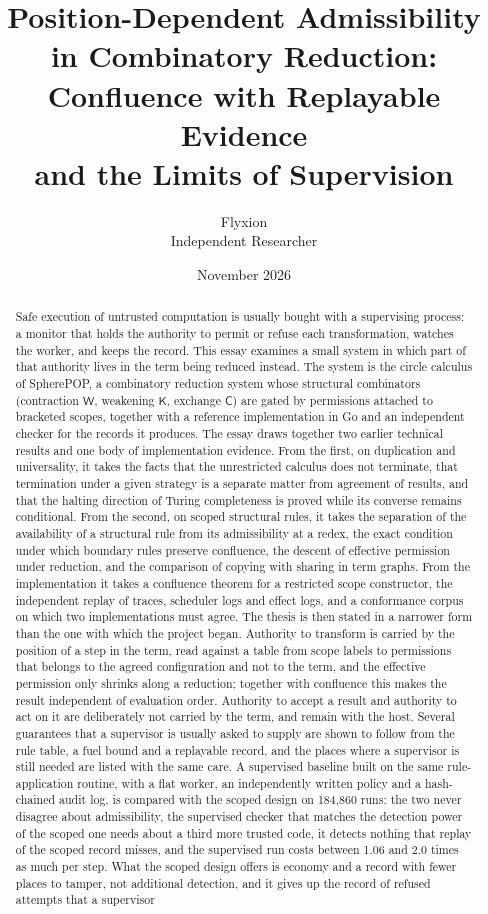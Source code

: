 \documentclass[11pt]{article}
\title{Position-Dependent Admissibility in Combinatory Reduction:\\Confluence with Replayable Evidence\\and the Limits of Supervision}
\author{Flyxion\\Independent Researcher}
\date{November 2026}
\theoremstyle{definition}
\theoremstyle{remark}
\newcommand{\cC}{\mathsf{C}}
\newcommand{\cK}{\mathsf{K}}
\newcommand{\cW}{\mathsf{W}}
\begin{document}
\maketitle

\begin{abstract}
\noindent
Safe execution of untrusted computation is usually bought with a supervising process: a monitor that holds the authority to permit or refuse each transformation, watches the worker, and keeps the record. This essay examines a small system in which part of that authority lives in the term being reduced instead. The system is the circle calculus of SpherePOP, a combinatory reduction system whose structural combinators (contraction $\cW$, weakening $\cK$, exchange $\cC$) are gated by permissions attached to bracketed scopes, together with a reference implementation in Go and an independent checker for the records it produces. The essay draws together two earlier technical results and one body of implementation evidence. From the first, on duplication and universality, it takes the facts that the unrestricted calculus does not terminate, that termination under a given strategy is a separate matter from agreement of results, and that the halting direction of Turing completeness is proved while its converse remains conditional. From the second, on scoped structural rules, it takes the separation of the availability of a structural rule from its admissibility at a redex, the exact condition under which boundary rules preserve confluence, the descent of effective permission under reduction, and the comparison of copying with sharing in term graphs. From the implementation it takes a confluence theorem for a restricted scope constructor, the independent replay of traces, scheduler logs and effect logs, and a conformance corpus on which two implementations must agree. The thesis is then stated in a narrower form than the one with which the project began. Authority to transform is carried by the position of a step in the term, read against a table from scope labels to permissions that belongs to the agreed configuration and not to the term, and the effective permission only shrinks along a reduction; together with confluence this makes the result independent of evaluation order. Authority to accept a result and authority to act on it are deliberately not carried by the term, and remain with the host. Several guarantees that a supervisor is usually asked to supply are shown to follow from the rule table, a fuel bound and a replayable record, and the places where a supervisor is still needed are listed with the same care. A supervised baseline built on the same rule-application routine, with a flat worker, an independently written policy and a hash-chained audit log, is compared with the scoped design on 184,860 runs: the two never disagree about admissibility, the supervised checker that matches the detection power of the scoped one needs about a third more trusted code, it detects nothing that replay of the scoped record misses, and the supervised run costs between 1.06 and 2.0 times as much per step. What the scoped design offers is economy and a record with fewer places to tamper, not additional detection, and it gives up the record of refused attempts that a supervisor 
\end{abstract}
\end{document}
